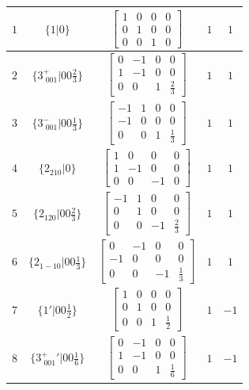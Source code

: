 \documentclass[fleqn,8pt]{jsarticle}
\begin{document}
\begin{longtable}{ccccc}
$ 1 $ & $ \{1|0\} $ & $ \begin{bmatrix} 1 & 0 & 0 & 0 \\ 0 & 1 & 0 & 0 \\ 0 & 0 & 1 & 0 \end{bmatrix} $ & $ 1 $ & $ 1 $ \\ \hline
$ 2 $ & $ \{3^{+}_{\,\,001}|0 0 \frac{2}{3}\} $ & $ \begin{bmatrix} 0 & -1 & 0 & 0 \\ 1 & -1 & 0 & 0 \\ 0 & 0 & 1 & \frac{2}{3} \end{bmatrix} $ & $ 1 $ & $ 1 $ \\ \hline
$ 3 $ & $ \{3^{-}_{\,\,001}|0 0 \frac{1}{3}\} $ & $ \begin{bmatrix} -1 & 1 & 0 & 0 \\ -1 & 0 & 0 & 0 \\ 0 & 0 & 1 & \frac{1}{3} \end{bmatrix} $ & $ 1 $ & $ 1 $ \\ \hline
$ 4 $ & $ \{2{}_{210}|0\} $ & $ \begin{bmatrix} 1 & 0 & 0 & 0 \\ 1 & -1 & 0 & 0 \\ 0 & 0 & -1 & 0 \end{bmatrix} $ & $ 1 $ & $ 1 $ \\ \hline
$ 5 $ & $ \{2{}_{120}|0 0 \frac{2}{3}\} $ & $ \begin{bmatrix} -1 & 1 & 0 & 0 \\ 0 & 1 & 0 & 0 \\ 0 & 0 & -1 & \frac{2}{3} \end{bmatrix} $ & $ 1 $ & $ 1 $ \\ \hline
$ 6 $ & $ \{2{}_{1-10}|0 0 \frac{1}{3}\} $ & $ \begin{bmatrix} 0 & -1 & 0 & 0 \\ -1 & 0 & 0 & 0 \\ 0 & 0 & -1 & \frac{1}{3} \end{bmatrix} $ & $ 1 $ & $ 1 $ \\ \hline
$ 7 $ & $ \{1{}'|0 0 \frac{1}{2}\} $ & $ \begin{bmatrix} 1 & 0 & 0 & 0 \\ 0 & 1 & 0 & 0 \\ 0 & 0 & 1 & \frac{1}{2} \end{bmatrix} $ & $ 1 $ & $ -1 $ \\ \hline
$ 8 $ & $ \{3^{+}_{\,\,001}{}'|0 0 \frac{1}{6}\} $ & $ \begin{bmatrix} 0 & -1 & 0 & 0 \\ 1 & -1 & 0 & 0 \\ 0 & 0 & 1 & \frac{1}{6} \end{bmatrix} $ & $ 1 $ & $ -1 $ \\ \hline

\end{longtable}
\end{document}
